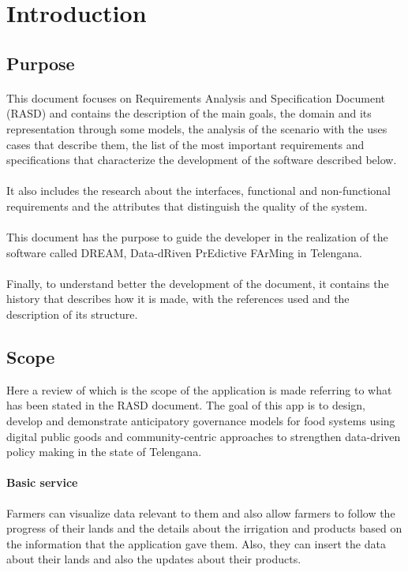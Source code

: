 \section{Introduction}
\subsection{Purpose}
\paragraph{}
This document focuses on Requirements Analysis and Specification Document (RASD) and contains the description of the main goals, the domain and its representation through some models, the analysis
of the scenario with the uses cases that describe them, the list of the most important requirements and specifications that characterize the development of the software described below.
\paragraph{}
It also includes the research about the interfaces, functional and non-functional requirements and the attributes that distinguish the quality of the system. 
\paragraph{}
This document has the purpose to guide the developer in the realization of the software called DREAM, Data-dRiven PrEdictive FArMing in Telengana.
\paragraph{}
Finally, to understand better the development of the document, it contains the history that describes how it is made, with the references used and the description of its structure.

\subsection{Scope}
Here a review of which is the scope of the application is made referring to what has been stated in the RASD document.
The goal of this app is to design, develop and demonstrate 
anticipatory governance models for food systems using digital public goods and community-centric approaches to strengthen data-driven policy making in the state of Telengana.
\paragraph{Basic service} Farmers can visualize data relevant to them and also allow farmers to follow the progress of their lands and the details about the irrigation and products based on the information that the application gave them. Also, they can insert the data about their lands and also the updates about their products.
